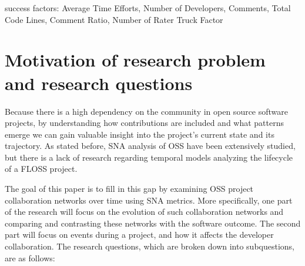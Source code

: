 success factors: Average Time Efforts, Number of Developers, Comments, Total Code Lines, Comment Ratio, Number of Rater \cite{yangHowMicrobloggingNetworks2013}
Truck Factor \cite{avelinoNovelApproachEstimating2016}


\section{Motivation of research problem and research questions}
Because there is a high dependency on the community in open source software projects, by understanding how contributions are included and what patterns emerge we can gain valuable insight into the project's current state and its trajectory. As stated before, SNA analysis of OSS have been extensively studied, but there is a lack of research regarding temporal models analyzing the lifecycle of a FLOSS project.

The goal of this paper is to fill in this gap by examining OSS project collaboration networks over time using SNA metrics. More specifically, one part of the research will focus on the evolution of such collaboration networks and comparing and contrasting these networks with the software outcome. The second part will focus on events during a project, and how it affects the developer collaboration. The research questions, which are broken down into subquestions, are as follows:


